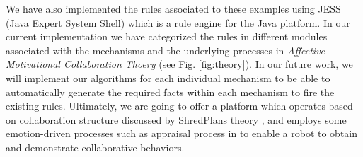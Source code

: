 We have also implemented the rules associated to these examples using JESS (Java
Expert System Shell) which is a rule engine for the Java platform. In our
current implementation we have categorized the rules in different modules
associated with the mechanisms and the underlying processes in \textit{Affective
Motivational Collaboration Thoery} (see Fig. \ref{fig:theory}). In our future
work, we will implement our algorithms for each individual mechanism to be able
to automatically generate the required facts within each mechanism to fire the
existing rules. Ultimately, we are going to offer a platform which operates
based on collaboration structure discussed by ShredPlans theory
\cite{grosz:discourse-structure}, and employs some emotion-driven processes such
as appraisal process in \cite{marsella:ema-process-model} to enable a robot to
obtain and demonstrate collaborative behaviors.




%
%






